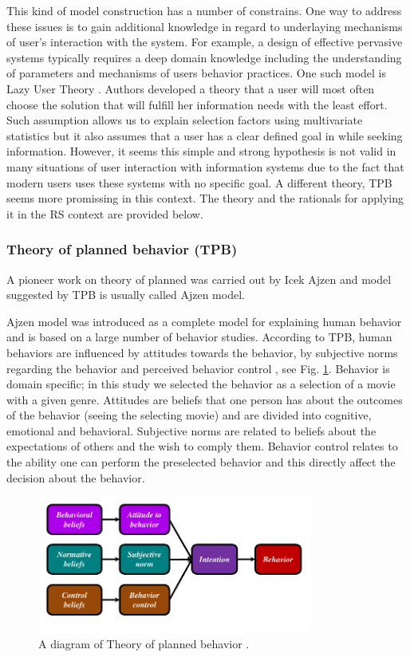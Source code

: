 \documentclass{llncs}
\begin{document}
This kind of model construction has a number of constrains. One way to address these issues is to gain additional knowledge in regard to underlaying mechanisms of user's interaction with the system. For example, a design of effective pervasive systems typically requires a deep domain knowledge including the understanding of parameters and mechanisms of users behavior practices. One such model is Lazy User Theory \cite{Tetard2009}. Authors developed a theory that a user will most often choose the solution that will fulfill her information needs with the least effort. Such assumption allows us to explain selection factors using multivariate statistics but it also assumes that a user has a clear defined goal in while seeking information. However, it seems this simple and strong hypothesis is not valid in many situations of user interaction with information systems due to the fact that modern users uses these systems with no specific goal. A different theory, TPB seems more promissing in this context. The theory and the rationals for applying it in the RS context are provided below.  


\subsubsection{Theory of planned behavior (TPB)}\label{SubSubSec_TPB} A pioneer work on theory of planned was carried out by Icek Ajzen \cite{Ajzen1991} and model suggested by TPB is usually called Ajzen model. 

Ajzen model was introduced as a complete model for explaining human behavior and is based on a large number of behavior studies. According to TPB, human behaviors are influenced by attitudes towards the behavior, by subjective norms regarding the behavior and perceived behavior control \cite{Ajzen1991}, see Fig. \ref{Fig_TPB}. Behavior is domain specific; in this study we selected the behavior as a selection of a movie with a given genre. Attitudes are beliefs that one person has about the outcomes of the behavior (seeing the selecting movie) and are divided into cognitive, emotional and behavioral. Subjective norms are related to beliefs about the expectations of others and the wish to comply them. Behavior control relates to the ability one can perform the preselected behavior and this directly affect the decision about the behavior. 

 \begin{figure}[h!]
 \begin{center}
   \includegraphics[width=9cm]{TpbScheme.pdf}
   \caption[Fig_TPB]{A diagram of Theory of planned behavior \cite{AjzenWebPage}.}
   \label{Fig_TPB}
 \end{center}
 \end{figure}
 
\end{document}
